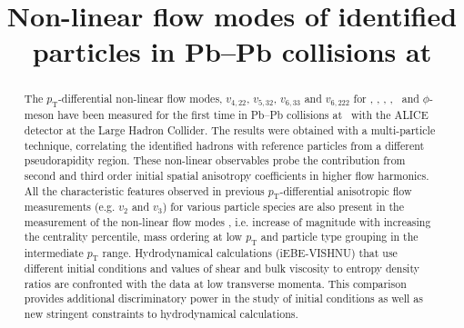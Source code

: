 \documentclass[ALICE,manyauthors]{cernphprep}
\begin{document}


\begin{titlepage}

\title{Non-linear flow modes of identified particles in Pb--Pb collisions at \sNN}


\begin{abstract}
\noindent The $p_{\mathrm{T}}$-differential non-linear flow modes, $v_{4,22}$, $v_{5,32}$, $v_{6,33}$ and $v_{6,222}$ for \pion, \kaon, \Ks, \proton, \lambdas~and $\phi$-meson have been measured for the first time in Pb--Pb collisions at \sNN~with the ALICE detector at the Large Hadron Collider. The results were obtained with a multi-particle technique, correlating the identified hadrons with reference particles from a different pseudorapidity region. %
These non-linear observables probe the contribution from second and third order initial spatial anisotropy coefficients in higher flow harmonics. All the characteristic features observed in previous $p_{\mathrm{T}}$-differential anisotropic flow measurements (e.g. $v_{2}$ and $v_{3}$) for various particle species are also present in the measurement of the non-linear flow modes , i.e. increase of magnitude with increasing the centrality percentile, mass ordering at low $p_{\mathrm{T}}$ and particle type grouping in the intermediate $p_{\mathrm{T}}$ range. Hydrodynamical calculations (iEBE-VISHNU) that use different initial conditions and values of shear and bulk viscosity to entropy density ratios are confronted with the data at low transverse momenta. This comparison provides additional discriminatory power in the study of initial conditions as well as new stringent constraints to hydrodynamical calculations.


\end{abstract}
\end{titlepage}
\end{document}
